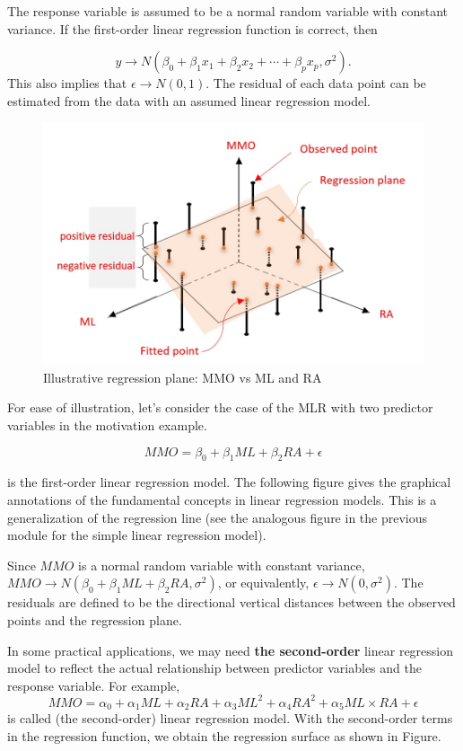 \documentclass[
]{book}
\begin{document}
The response variable is assumed to be a normal random variable with constant variance. If the first-order linear regression function is correct, then

\[y \to N(\beta_0 + \beta_1 x_1 + \beta_2 x_2 + \cdots + \beta_p x_p, \sigma^2).\]
This also implies that \(\epsilon \to N(0,1)\). The residual of each data point can be estimated from the data with an assumed linear regression model.

\begin{figure}

{\centering \includegraphics[width=0.8\linewidth]{img10/w10-RegressionPlane} 

}

\caption{Illustrative regression plane: MMO vs ML and RA}\label{fig:unnamed-chunk-153}
\end{figure}

For ease of illustration, let's consider the case of the MLR with two predictor variables in the motivation example.

\[MMO = \beta_0 + \beta_1 ML + \beta_2 RA + \epsilon\]

is the first-order linear regression model. The following figure gives the graphical annotations of the fundamental concepts in linear regression models. This is a generalization of the regression line (see the analogous figure in the previous module for the simple linear regression model).

Since \(MMO\) is a normal random variable with constant variance, \(MMO \to N(\beta_0+\beta_1ML +\beta_2 RA, \sigma^2)\), or equivalently, \(\epsilon \to N(0, \sigma^2)\). The residuals are defined to be the directional vertical distances between the observed points and the regression plane.

In some practical applications, we may need \textbf{the second-order} linear regression model to reflect the actual relationship between predictor variables and the response variable. For example, \[MMO = \alpha_0 + \alpha_1 ML + \alpha_2 RA + \alpha_3 ML^2 + \alpha_4 RA^2 + \alpha_5 ML\times RA + \epsilon\] is called (the second-order) linear regression model. With the second-order terms in the regression function, we obtain the regression surface as shown in Figure.
\end{document}
